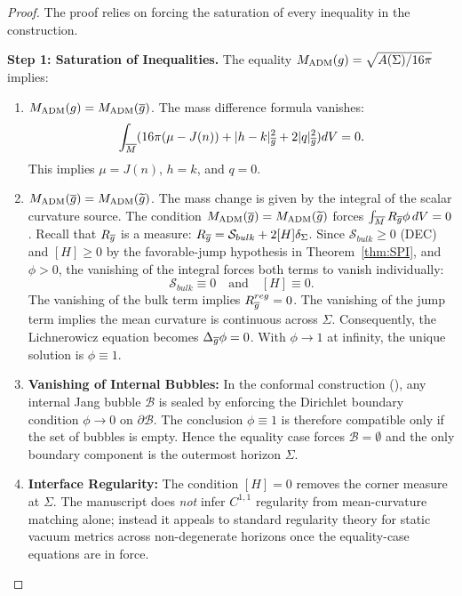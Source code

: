 \begin{proof}
The proof relies on forcing the saturation of every inequality in the construction.

\textbf{Step 1: Saturation of Inequalities.}
The equality $M_{\mathrm{ADM}}(g) = \sqrt{A(\Sigma)/16\pi}$ implies:
\begin{enumerate}
    \item $M_{\mathrm{ADM}}(g) = M_{\mathrm{ADM}}(\overline{g})$. The mass difference formula vanishes:
    \[ \int_{\overline{M}} (16\pi(\mu-J(n)) + |h-k|_{\overline{g}}^2 + 2|q|_{\overline{g}}^2) dV = 0. \]
    This implies $\mu=J(n)$, $h=k$, and $q=0$.
    \item $M_{\mathrm{ADM}}(\overline{g}) = M_{\mathrm{ADM}}(\widetilde{g})$. The mass change is given by the integral of the scalar curvature source. The condition $M_{\mathrm{ADM}}(\overline{g}) = M_{\mathrm{ADM}}(\widetilde{g})$ forces $\int_{\overline{M}} R_{\overline{g}} \phi \, dV = 0$.
    Recall that $R_{\overline{g}}$ is a measure: $R_{\overline{g}} = \mathcal{S}_{bulk} + 2[H]\delta_\Sigma$.
    Since $\mathcal{S}_{bulk} \ge 0$ (DEC) and $[H] \ge 0$ by the favorable-jump hypothesis in Theorem~\ref{thm:SPI}, and $\phi > 0$, the vanishing of the integral forces both terms to vanish individually:
    \[ \mathcal{S}_{bulk} \equiv 0 \quad \text{and} \quad [H] \equiv 0. \]
    The vanishing of the bulk term implies $R_{\overline{g}}^{reg} = 0$.
    The vanishing of the jump term implies the mean curvature is continuous across $\Sigma$.
    Consequently, the Lichnerowicz equation becomes $\Delta_{\overline{g}} \phi = 0$. With $\phi \to 1$ at infinity, the unique solution is $\phi \equiv 1$.
    \item \textbf{Vanishing of Internal Bubbles:} In the conformal construction (), any internal Jang bubble $\mathcal{B}$ is sealed by enforcing the Dirichlet boundary condition $\phi \to 0$ on $\partial \mathcal{B}$. The conclusion $\phi \equiv 1$ is therefore compatible only if the set of bubbles is empty. Hence the equality case forces $\mathcal{B} = \emptyset$ and the only boundary component is the outermost horizon $\Sigma$.
    \item \textbf{Interface Regularity:} The condition $[H]=0$ removes the corner measure at $\Sigma$. The manuscript does \emph{not} infer $C^{1,1}$ regularity from mean-curvature matching alone; instead it appeals to standard regularity theory for static vacuum metrics across non-degenerate horizons once the equality-case equations are in force.
\end{enumerate}


\end{proof}
